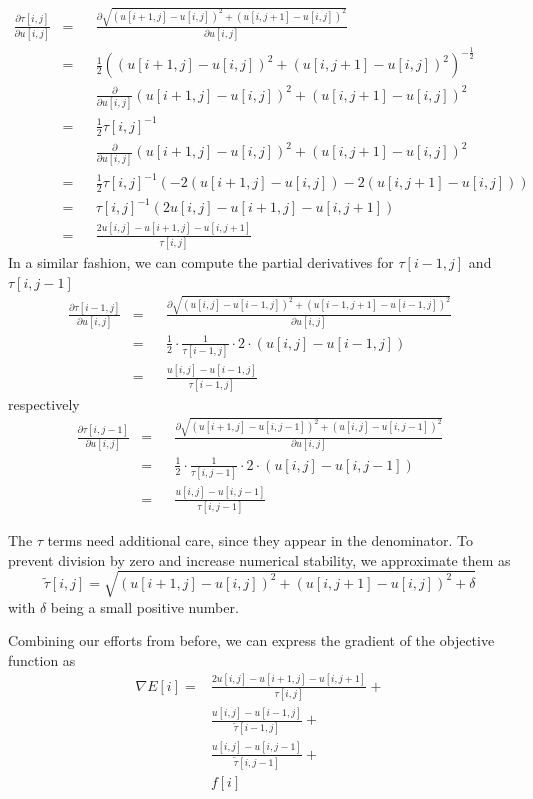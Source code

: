 \documentclass{paper}
\begin{document}
\begin{align}
\frac{\partial \tau[i,j]}{\partial u[i,j]} 
&= &&\frac{\partial \sqrt{(u[i+1,j] - u[i,j])^2 + (u[i, j+1] - u[i, j])^2}}{\partial u[i,j]} \\
&= &&\frac{1}{2} ((u[i+1,j] - u[i,j])^2 + (u[i, j+1] - u[i, j])^2)^{-\frac{1}{2}} \\
& &&\frac{\partial}{\partial u[i,j]} 
(u[i+1,j] - u[i,j])^2 + (u[i, j+1] - u[i, j])^2 \\
&= &&\frac{1}{2}\tau[i,j]^{-1} \\
& &&\frac{\partial}{\partial u[i,j]} 
(u[i+1,j] - u[i,j])^2 + (u[i, j+1] - u[i, j])^2 \\
&= &&\frac{1}{2}\tau[i,j]^{-1}
(-2(u[i + 1, j] - u[i,j]) - 2(u[i, j+1] - u[i,j])) \\
&= &&\tau[i,j]^{-1} (2 u[i,j] -u[i + 1, j] - u[i, j+1]) \\
&= &&\frac{2u[i,j] - u[i + 1, j] - u[i, j+1]}{\tau[i,j]}
\end{align}
In a similar fashion, we can compute the partial derivatives for
$\tau[i-1, j]$ and $\tau[i, j - 1]$
\begin{align}
\frac{\partial \tau[i - 1,j]}{\partial u[i,j]} 
&= &&\frac{\partial \sqrt{(u[i,j] - u[i-1,j])^2 + (u[i-1, j+1] - u[i-1, j])^2}}{\partial u[i,j]} \\
&= &&\frac{1}{2} \cdot \frac{1}{\tau[i - 1, j]} \cdot 2 \cdot (u[i,j] - u[i-1, j]) \\
&= &&\frac{u[i,j] - u[i-1, j]}{\tau[i - 1, j]}
\end{align}
respectively
\begin{align}
\frac{\partial \tau[i,j-1]}{\partial u[i,j]} 
&= &&\frac{\partial \sqrt{(u[i + 1 ,j] - u[i,j - 1])^2 + (u[i, j] - u[i, j - 1])^2}}{\partial u[i,j]} \\
&= &&\frac{1}{2} \cdot \frac{1}{\tau[i, j - 1]} \cdot 2 \cdot (u[i,j] - u[i, j-1]) \\
&= &&\frac{u[i,j] - u[i, j - 1]}{\tau[i, j-1]}
\end{align}

The $\tau$ terms need additional care, since they appear in the denominator. To prevent division by zero and increase numerical 
stability, we approximate them as 
\begin{equation}
\tilde{\tau}[i,j] = \sqrt{(u[i+1,j] - u[i,j])^2 + (u[i, j+1] - u[i, j])^2 + \delta}
\end{equation}
with $\delta$ being a small positive number.

Combining our efforts from before, we can express the gradient of the objective function as
\begin{align}
\nabla E[i] = &\frac{2u[i,j] - u[i + 1, j] - u[i, j+1]}{\tau[i,j]} + \\
	&\frac{u[i,j] - u[i - 1, j]}{\tilde{\tau}[i - 1, j]} + \\
	&\frac{u[i,j] - u[i, j - 1]}{\tilde{\tau}[i, j-1]} + \\
	&f[i]
\end{align}
\end{document}
